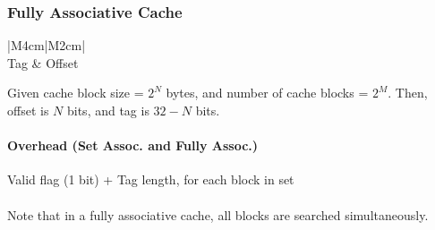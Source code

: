 \documentclass[a4paper]{article}
\begin{document}
\begin{multicols*}{3}
    \subsubsection*{Fully Associative Cache}
      \begin{center}
        \begin{tabular}{ |M{4cm}|M{2cm}| }
           \\
          \hline
          Tag & Offset \\
          \hline
        \end{tabular}
      \end{center}
      Given cache block size = $2^N$ bytes, and number of cache blocks = $2^M$. Then, offset is $N$ bits, and tag is $32 - N$ bits.
      \paragraph{Overhead (Set Assoc. and Fully Assoc.)} Valid flag (1 bit) + Tag length, for each block in set
      \\\\
      Note that in a fully associative cache, all blocks are searched simultaneously.
  \end{multicols*}
\end{document}
